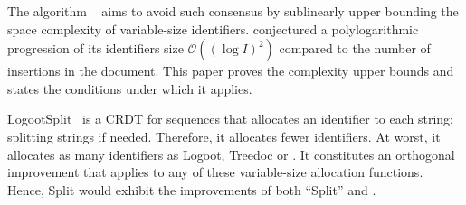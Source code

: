 \noindent The algorithm \LSEQ~\cite{nedelec2013lseq} aims to avoid such
consensus by sublinearly upper bounding the space complexity of variable-size
identifiers. \cite{nedelec2013lseq} conjectured a polylogarithmic progression of
its identifiers size $\mathcal{O}((\log I)^2)$ compared to the number of
insertions in the document. This paper proves the complexity upper bounds and
states the conditions under which it applies.

LogootSplit~\cite{andre2013supporting} is a CRDT for sequences that allocates an
identifier to each string; splitting strings if needed. Therefore, it allocates
fewer identifiers. At worst, it allocates as many identifiers as Logoot, Treedoc
or \LSEQ. It constitutes an orthogonal improvement that applies to any of these
variable-size allocation functions. Hence, \LSEQ{}Split would exhibit the
improvements of both ``Split'' and \LSEQ.


